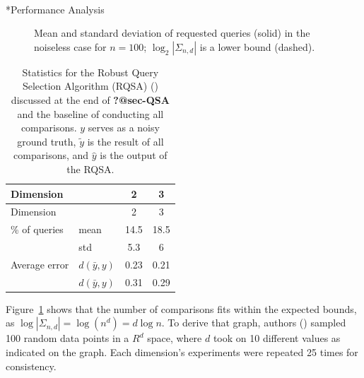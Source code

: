 \documentclass[
  letterpaper,
  numbers=noenddot,
  DIV=11]{scrreprt}
\makeatletter
\let\oldparagraph\paragraph
\renewcommand{\paragraph}{
    \@ifstar
      \xxxParagraphStar
      \xxxParagraphNoStar
  }
\newcommand{\xxxParagraphStar}[1]{\oldparagraph*{#1}\mbox{}}
\newcommand{\xxxParagraphNoStar}[1]{\oldparagraph{#1}\mbox{}}
\theoremstyle{plain}
\theoremstyle{definition}
\theoremstyle{plain}
\theoremstyle{remark}
\makeatother
\begin{document}
\paragraph*{Performance Analysis}\label{sec-QSA}

\begin{figure}


\caption{\label{fig-rand_n}Mean and standard deviation of requested
queries (solid) in the noiseless case for \(n = 100\);
\(\log_2|\Sigma_{n,d}|\) is a lower bound (dashed).}

\end{figure}%

\begin{longtable}[]{@{}llcc@{}}
\caption{Statistics for the Robust Query Selection Algorithm (RQSA)
() discussed at the end of
\textbf{?@sec-QSA} and the baseline of conducting all comparisons. \(y\)
serves as a noisy ground truth, \(\tilde{y}\) is the result of all
comparisons, and \(\hat{y}\) is the output of the
RQSA.}\label{tbl-geo_acc}\tabularnewline
\toprule\noalign{}
Dimension & & 2 & 3 \\
\midrule\noalign{}
\endfirsthead
\toprule\noalign{}
Dimension & & 2 & 3 \\
\midrule\noalign{}
\endhead
\bottomrule\noalign{}
\endlastfoot
\% of queries & mean & 14.5 & 18.5 \\
& std & 5.3 & 6 \\
Average error & \(d(\bar{y}, y)\) & 0.23 & 0.21 \\
& \(d(\bar{y}, y)\) & 0.31 & 0.29 \\
\end{longtable}

Figure~\ref{fig-rand_n} shows that the number of comparisons fits within
the expected bounds, as \(\log|\Sigma_{n,d}| = \log(n^d) = d\log n\). To
derive that graph, authors ()
sampled 100 random data points in a \(R^d\) space, where \(d\) took on
10 different values as indicated on the graph. Each dimension's
experiments were repeated 25 times for consistency.
\end{document}
